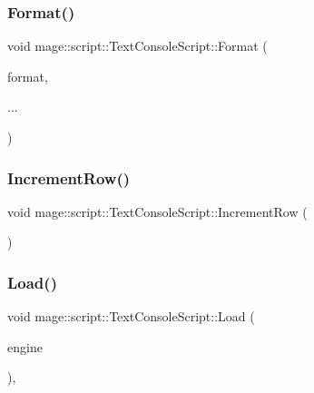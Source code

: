 \subsubsection{\texorpdfstring{Format()}{Format()}}
{\footnotesize\ttfamily void mage\+::script\+::\+Text\+Console\+Script\+::\+Format (\begin{DoxyParamCaption}\item[{\hyperlink{namespacemage_a8769f9d670d6b585ea306cb1062af94b}{Not\+Null}$<$ \hyperlink{namespacemage_ac409e0f2a22292a3a4cd42742994fbf0}{const\+\_\+wzstring} $>$}]{format,  }\item[{}]{... }\end{DoxyParamCaption})}

\hypertarget{classmage_1_1script_1_1_text_console_script_a3d4cba4fd8a2733933a7a444c6beaf1a}{}\label{classmage_1_1script_1_1_text_console_script_a3d4cba4fd8a2733933a7a444c6beaf1a} 
\subsubsection{\texorpdfstring{Increment\+Row()}{IncrementRow()}}
{\footnotesize\ttfamily void mage\+::script\+::\+Text\+Console\+Script\+::\+Increment\+Row (\begin{DoxyParamCaption}{ }\end{DoxyParamCaption})\hspace{0.3cm}{\ttfamily [private]}}

\hypertarget{classmage_1_1script_1_1_text_console_script_a1e5a7bdff2d47b835932d7220a4e2571}{}\label{classmage_1_1script_1_1_text_console_script_a1e5a7bdff2d47b835932d7220a4e2571} 
\subsubsection{\texorpdfstring{Load()}{Load()}}
{\footnotesize\ttfamily void mage\+::script\+::\+Text\+Console\+Script\+::\+Load (\begin{DoxyParamCaption}\item[{\mbox{[}\mbox{[}maybe\+\_\+unused\mbox{]} \mbox{]} \hyperlink{classmage_1_1_engine}{Engine} \&}]{engine }\end{DoxyParamCaption})\hspace{0.3cm}{\ttfamily [override]}, {\ttfamily [virtual]}}

